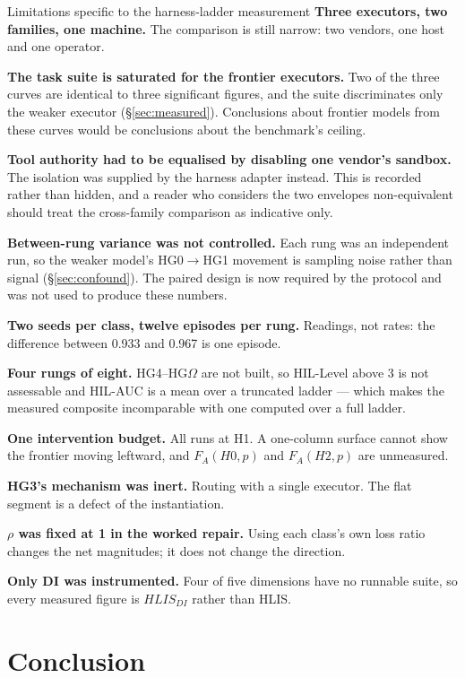 \documentclass[11pt]{article}
\theoremstyle{definition}
\newcommand{\Om}{\ensuremath{\Omega}}
\begin{document}
\begin{cautionbox}{Limitations specific to the harness-ladder measurement}
\textbf{Three executors, two families, one machine.} The comparison is still narrow: two vendors, one host and one operator.

\textbf{The task suite is saturated for the frontier executors.} Two of the three curves are identical to three significant figures, and the suite discriminates only the weaker executor (\S\ref{sec:measured}). Conclusions about frontier models from these curves would be conclusions about the benchmark's ceiling.

\textbf{Tool authority had to be equalised by disabling one vendor's sandbox.} The isolation was supplied by the harness adapter instead. This is recorded rather than hidden, and a reader who considers the two envelopes non-equivalent should treat the cross-family comparison as indicative only.

\textbf{Between-rung variance was not controlled.} Each rung was an independent run, so the weaker model's HG0$\to$HG1 movement is sampling noise rather than signal (\S\ref{sec:confound}). The paired design is now required by the protocol and was not used to produce these numbers.

\textbf{Two seeds per class, twelve episodes per rung.} Readings, not rates: the difference between 0.933 and 0.967 is one episode.

\textbf{Four rungs of eight.} HG4--HG\Om{} are not built, so HIL-Level above 3 is not assessable and HIL-AUC is a mean over a truncated ladder --- which makes the measured composite incomparable with one computed over a full ladder.

\textbf{One intervention budget.} All runs at H1. A one-column surface cannot show the frontier moving leftward, and $F_A(H0,p)$ and $F_A(H2,p)$ are unmeasured.

\textbf{HG3's mechanism was inert.} Routing with a single executor. The flat segment is a defect of the instantiation.

\textbf{$\rho$ was fixed at 1 in the worked repair.} Using each class's own loss ratio changes the net magnitudes; it does not change the direction.

\textbf{Only DI was instrumented.} Four of five dimensions have no runnable suite, so every measured figure is $HLIS_{DI}$ rather than HLIS.
\end{cautionbox}

\section{Conclusion}
\end{document}
